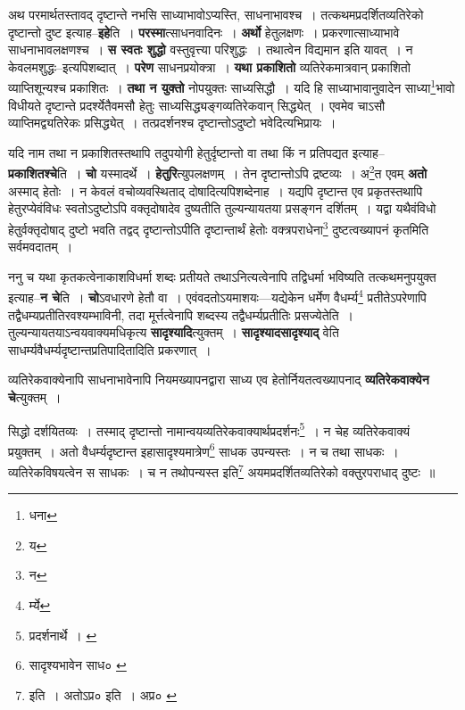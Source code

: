 \documentclass[article,12pt,a4paper]{memoir}
\begin{document}
	  \pstart अथ परमार्थतस्तावद् दृष्टान्ते नभसि साध्याभावोऽप्यस्ति, साधनाभावश्च । तत्कथमप्रदर्शितव्यतिरेको दृष्टान्तो दुष्ट इत्याह--\textbf{इहे}ति । \textbf{परस्मा}त्साधनवादिनः । \textbf{अर्थो} हेतुलक्षणः । प्रकरणात्साध्याभावे साधनाभावलक्षणश्च । \textbf{स स्वतः शुद्धो} वस्तुवृत्त्या परिशुद्धः । तथात्वेन विद्यमान इति यावत् । न केवलमशुद्धः--इत्यपिशब्दात् । \textbf{परेण} साधनप्रयोक्त्रा । \textbf{यथा प्रकाशितो} व्यतिरेकमात्रवान् प्रकाशितो व्याप्तिशून्यश्च प्रकाशितः । \textbf{तथा न युक्तो} नोपयुक्तः साध्यसिद्धौ । यदि हि साध्याभावानुवादेन साध्या\footnote{धना}भावो विधीयते दृष्टान्ते प्रदर्श्येतैवमसौ हेतुः साध्यसिद्ध्यङ्गव्यतिरेकवान् सिद्ध्येत् । एवमेव चाऽसौ व्याप्तिमद्व्यतिरेकः प्रसिद्ध्येत् । तत्प्रदर्शनश्च दृष्टान्तोऽदुष्टो भवेदित्यभिप्रायः ।
	\pend
      

	  \pstart यदि नाम तथा न प्रकाशितस्तथापि तदुपयोगी हेतुर्दृष्टान्तो वा तथा किं न प्रतिपद्यत इत्याह--\textbf{प्रकाशितश्चे}ति । \textbf{चो} यस्मादर्थे । \textbf{हेतुरि}त्युपलक्षणम् । तेन दृष्टान्तोऽपि द्रष्टव्यः । अ\footnote{य}त एवम् \textbf{अतो} अस्माद् हेतोः । न केवलं वचोव्यवस्थिताद् दोषादित्यपिशब्देनाह । यद्यपि दृष्टान्त एव प्रकृतस्तथापि हेतुरप्येवंविधः स्वतोऽदुष्टोऽपि वक्तृदोषादेव दुष्यतीति तुल्यन्यायतया प्रसङ्गन दर्शितम् । यद्वा यथैवंविधो हेतुर्वक्तृदोषाद् दुष्टो भवति तद्वद् दृष्टान्तोऽपीति दृष्टान्तार्थं हेतोः वक्त्रपराधेना\footnote{न} दुष्टत्वख्यापनं कृतमिति सर्वमवदातम् ।
	\pend
      

	  \pstart \leavevmode{} ननु च यथा कृतकत्वेनाकाशविधर्मा शब्दः प्रतीयते तथाऽनित्यत्वेनापि तद्विधर्मा भविष्यति तत्कथमनुपयुक्त इत्याह--\textbf{न चे}ति । \textbf{चो}ऽवधारणे हेतौ वा । एवंवदतोऽयमाशयः—यद्येकेन धर्मेण वैधर्म्य\footnote{र्म्ये} प्रतीतेऽपरेणापि तद्वैधम्यप्रतीतिरवश्यम्भाविनी, तदा मूर्त्तत्वेनापि शब्दस्य तद्वैधर्म्यप्रतीतिः प्रसज्येतेति । तुल्यन्यायतयाऽन्वयवाक्यमधिकृत्य \textbf{सादृश्यादि}त्युक्तम् । \textbf{सादृश्यादसादृश्याद्} वेति साधर्म्यवैधर्म्यदृष्टान्तप्रतिपादितादिति प्रकरणात् ।
	\pend
      

	  \pstart व्यतिरेकवाक्येनापि साधनाभावेनापि नियमख्यापनद्वारा साध्य एव हेतोर्नियतत्वख्यापनाद् \textbf{व्यतिरेकवाक्येन चे}त्युक्तम् ।
	\pend
      \leavevmode{}
	  \bigskip
	  \begingroup
	

	  \pstart सिद्धो दर्शयितव्यः । तस्माद् दृष्टान्तो नामान्वयव्यतिरेकवाक्यार्थप्रदर्शनः\footnote{प्रदर्शनार्थे । \cite{dp-msC} \cite{dp-msD}} । न चेह व्यतिरेकवाक्यं प्रयुक्तम् । अतो वैधर्म्यदृष्टान्त इहासादृश्यमात्रेण\footnote{सादृश्यभावेन साध० \cite{dp-msA} \cite{dp-msB} \cite{dp-edP} \cite{dp-edH} \cite{dp-edN}} साधक उपन्यस्तः । न च तथा साधकः । व्यतिरेकविषयत्वेन स साधकः । च न तथोपन्यस्त इति\footnote{इति । अतोऽप्र० \cite{dp-msA} \cite{dp-edP} \cite{dp-edH} \cite{dp-edE} \cite{dp-edN} इति । अप्र० \cite{dp-msC}} अयमप्रदर्शितव्यतिरेको वक्तुरपराधाद् दुष्टः ॥
	\pend
       
\end{document}
